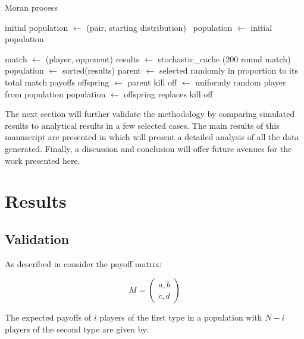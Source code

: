 \documentclass[10pt,letterpaper]{article}
\begin{document}
\begin{algorithm}[!hbtp]
        \caption{Moran process}
        \label{alg:moran_process}
          \begin{algorithmic}[1]
          \STATE initial population $\gets$ (pair, starting distribution) \
          \STATE population $\gets$ initial population

                \STATE match $\gets$ (player, opponent)
                \STATE results $\gets$ stochastic\_cache (200 round match)
                \ENDFOR
              \ENDFOR
              \STATE population $\gets$ sorted(results)
              \STATE parent $\gets$ selected randomly in proportion to its total match payoffs
              \STATE offspring $\gets$ parent
              \STATE kill off $\gets$ uniformly random player from population
              \STATE population $\gets$ offspring replaces kill off
            \ENDWHILE
          \end{algorithmic}
\end{algorithm}

The next section will further validate the methodology by comparing
simulated results to analytical results in a few selected cases. The main
results of this
manuscript are presented in which will
present a detailed analysis of all the data generated. Finally,
a discussion and conclusion will offer future avenues for the work
presented here.

\section*{Results}

\subsection*{Validation}

As described in \cite{Nowak} consider the payoff matrix:

\begin{equation}\label{equ:payoff_matrix}
    M = \begin{pmatrix}
        a, b\\
        c, d
        \end{pmatrix}
\end{equation}

The expected payoffs of \(i\) players of the first type in a population with \(N
- i\) players of the second type are given by:
\end{document}
